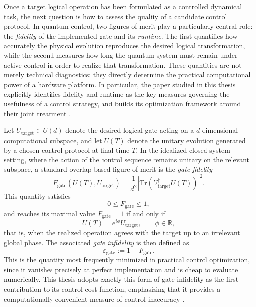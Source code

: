 Once a target logical operation has been formulated as a controlled dynamical task, the next question is how to assess the quality of a candidate control protocol. In quantum control, two figures of merit play a particularly central role: the \emph{fidelity} of the implemented gate and its \emph{runtime}. The first quantifies how accurately the physical evolution reproduces the desired logical transformation, while the second measures how long the quantum system must remain under active control in order to realize that transformation. These quantities are not merely technical diagnostics: they directly determine the practical computational power of a hardware platform. In particular, the paper studied in this thesis explicitly identifies fidelity and runtime as the key measures governing the usefulness of a control strategy, and builds its optimization framework around their joint treatment \cite{Niu2019}.

Let $U_{\mathrm{target}} \in U(d)$ denote the desired logical gate acting on a $d$-dimensional computational subspace, and let $U(T)$ denote the unitary evolution generated by a chosen control protocol at final time $T$. In the idealized closed-system setting, where the action of the control sequence remains unitary on the relevant subspace, a standard overlap-based figure of merit is the \emph{gate fidelity}
\begin{equation}
F_{\mathrm{gate}}\!\left(U(T),U_{\mathrm{target}}\right)
=
\frac{1}{d^{2}}
\left|
\mathrm{Tr}\!\left(U_{\mathrm{target}}^{\dagger}U(T)\right)
\right|^{2}.
\label{eq:gate_fidelity_unitary}
\end{equation}
This quantity satisfies
\begin{equation}
0 \leq F_{\mathrm{gate}} \leq 1,
\label{eq:fidelity_bounds}
\end{equation}
and reaches its maximal value $F_{\mathrm{gate}}=1$ if and only if
\begin{equation}
U(T)=e^{i\phi}U_{\mathrm{target}},
\qquad
\phi\in\mathbb{R},
\label{eq:perfect_gate_global_phase}
\end{equation}
that is, when the realized operation agrees with the target up to an irrelevant global phase. The associated \emph{gate infidelity} is then defined as
\begin{equation}
\varepsilon_{\mathrm{gate}}
:=
1-F_{\mathrm{gate}}.
\label{eq:gate_infidelity_def}
\end{equation}
This is the quantity most frequently minimized in practical control optimization, since it vanishes precisely at perfect implementation and is cheap to evaluate numerically. This thesis adopts exactly this form of gate infidelity as the first contribution to its control cost function, emphasizing that it provides a computationally convenient measure of control inaccuracy \cite{Niu2019}.


